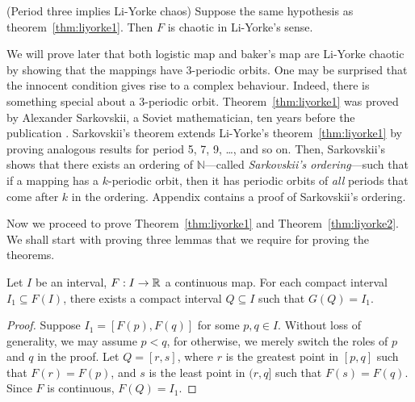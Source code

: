 \documentclass[12pt,draft,twoside]{book}
\begin{document}
\begin{theorem}
  (Period three implies Li-Yorke chaos)
  Suppose the same hypothesis as theorem~\ref{thm:liyorke1}.
  Then $F$ is chaotic in Li-Yorke's sense.
  \label{thm:liyorke2}
\end{theorem}

We will prove later that both logistic map and baker's map are Li-Yorke chaotic by showing that the mappings have 3-periodic orbits.
One may be surprised that the innocent condition gives rise to a complex behaviour.
Indeed, there is something special about a 3-periodic orbit.
Theorem~\ref{thm:liyorke1} was proved by Alexander Sarkovskii, a Soviet mathematician, ten years before the publication \citep{sarkovskii}.
Sarkovskii's theorem extends Li-Yorke's theorem~\ref{thm:liyorke1} by proving analogous results for period 5, 7, 9, \ldots, and so on.
Then, Sarkovskii's shows that there exists an ordering of $\mathbb{N}$---called \textit{Sarkovskii's ordering}---such that if a mapping has a $k$-periodic orbit, then it has periodic orbits of \textit{all} periods that come after $k$ in the ordering.
Appendix contains a proof of Sarkovskii's ordering.

Now we proceed to prove Theorem~\ref{thm:liyorke1} and Theorem~\ref{thm:liyorke2}.
We shall start with proving three lemmas that we require for proving the theorems.

\begin{lemma}
  Let $I$ be an interval, $F: I \to \mathbb{R}$ a continuous map.
  For each compact interval $I_1 \subseteq F(I)$, there exists a compact interval $Q \subseteq I$ such that $G(Q) = I_1$.
  \label{lem:liyorke1}
  \begin{proof}
    Suppose $I_1 = [F(p),F(q)]$ for some $p,q \in I$.
    Without loss of generality, we may assume $p < q$, for otherwise, we merely switch the roles of $p$ and $q$ in the proof.
    Let $Q = [r,s]$, where $r$ is the greatest point in $[p,q]$ such that $F(r) = F(p)$, and $s$ is the least point in $(r,q]$ such that $F(s) = F(q)$.
    Since $F$ is continuous, $F(Q) = I_1$.
  \end{proof}
\end{lemma}
\end{document}
